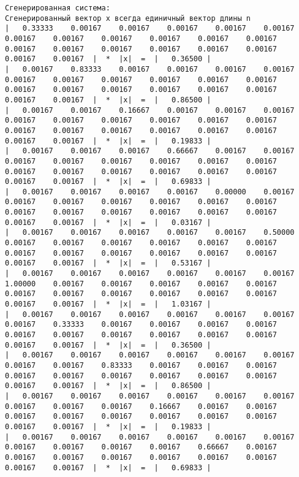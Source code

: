 \documentclass[a4paper,12pt,titlepage,finall]{article}
\begin{document}
\begin{verbatim}
Сгенерированная система:
Сгенерированный вектор x всегда единичный вектор длины n
|   0.33333    0.00167    0.00167    0.00167    0.00167    0.00167    0.00167    0.00167    0.00167    0.00167    0.00167    0.00167    0.00167    0.00167    0.00167    0.00167    0.00167    0.00167    0.00167    0.00167  |  *  |x|  =  |   0.36500 |
|   0.00167    0.83333    0.00167    0.00167    0.00167    0.00167    0.00167    0.00167    0.00167    0.00167    0.00167    0.00167    0.00167    0.00167    0.00167    0.00167    0.00167    0.00167    0.00167    0.00167  |  *  |x|  =  |   0.86500 |
|   0.00167    0.00167    0.16667    0.00167    0.00167    0.00167    0.00167    0.00167    0.00167    0.00167    0.00167    0.00167    0.00167    0.00167    0.00167    0.00167    0.00167    0.00167    0.00167    0.00167  |  *  |x|  =  |   0.19833 |
|   0.00167    0.00167    0.00167    0.66667    0.00167    0.00167    0.00167    0.00167    0.00167    0.00167    0.00167    0.00167    0.00167    0.00167    0.00167    0.00167    0.00167    0.00167    0.00167    0.00167  |  *  |x|  =  |   0.69833 |
|   0.00167    0.00167    0.00167    0.00167    0.00000    0.00167    0.00167    0.00167    0.00167    0.00167    0.00167    0.00167    0.00167    0.00167    0.00167    0.00167    0.00167    0.00167    0.00167    0.00167  |  *  |x|  =  |   0.03167 |
|   0.00167    0.00167    0.00167    0.00167    0.00167    0.50000    0.00167    0.00167    0.00167    0.00167    0.00167    0.00167    0.00167    0.00167    0.00167    0.00167    0.00167    0.00167    0.00167    0.00167  |  *  |x|  =  |   0.53167 |
|   0.00167    0.00167    0.00167    0.00167    0.00167    0.00167    1.00000    0.00167    0.00167    0.00167    0.00167    0.00167    0.00167    0.00167    0.00167    0.00167    0.00167    0.00167    0.00167    0.00167  |  *  |x|  =  |   1.03167 |
|   0.00167    0.00167    0.00167    0.00167    0.00167    0.00167    0.00167    0.33333    0.00167    0.00167    0.00167    0.00167    0.00167    0.00167    0.00167    0.00167    0.00167    0.00167    0.00167    0.00167  |  *  |x|  =  |   0.36500 |
|   0.00167    0.00167    0.00167    0.00167    0.00167    0.00167    0.00167    0.00167    0.83333    0.00167    0.00167    0.00167    0.00167    0.00167    0.00167    0.00167    0.00167    0.00167    0.00167    0.00167  |  *  |x|  =  |   0.86500 |
|   0.00167    0.00167    0.00167    0.00167    0.00167    0.00167    0.00167    0.00167    0.00167    0.16667    0.00167    0.00167    0.00167    0.00167    0.00167    0.00167    0.00167    0.00167    0.00167    0.00167  |  *  |x|  =  |   0.19833 |
|   0.00167    0.00167    0.00167    0.00167    0.00167    0.00167    0.00167    0.00167    0.00167    0.00167    0.66667    0.00167    0.00167    0.00167    0.00167    0.00167    0.00167    0.00167    0.00167    0.00167  |  *  |x|  =  |   0.69833 |

\end{verbatim}
\end{document}
